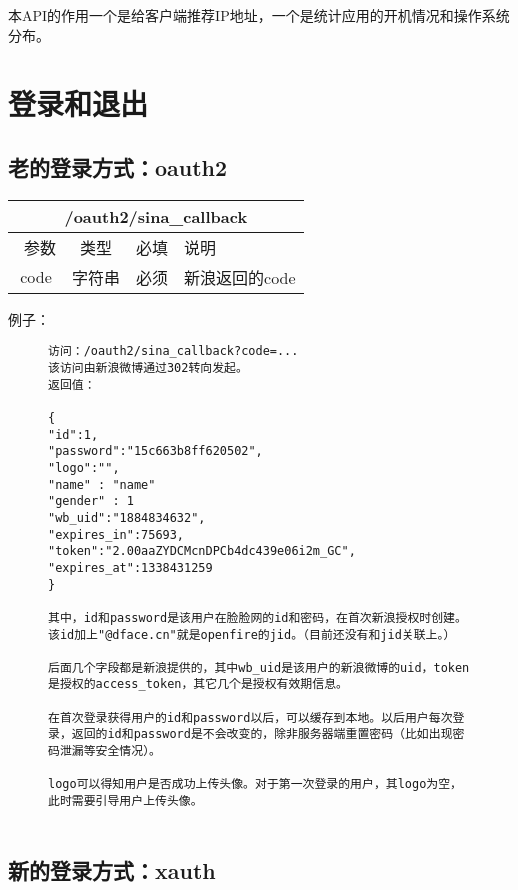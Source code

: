 \documentclass[cs4size]{ctexartutf8}
\begin{document}
本API的作用一个是给客户端推荐IP地址，一个是统计应用的开机情况和操作系统分布。




\section{登录和退出}
\subsection{老的登录方式：oauth2}


\begin{table}[H]
   \begin{center}
\begin{tabular}{|c|c|c|p{12cm}|}
\hline
\multicolumn{4}{|c|}{/oauth2/sina\_callback} \\
\hline\hline
 \  参数  & 类型 & 必填 &  说明  \\
\hline
 code  & 字符串 & 必须 &  新浪返回的code\\
\hline
\end{tabular}
   \end{center}
\end{table}


例子：

\begin{figure}[H]
\begin{verbatim}
访问：/oauth2/sina_callback?code=...
该访问由新浪微博通过302转向发起。
返回值：

{
"id":1,
"password":"15c663b8ff620502",
"logo":"",
"name" : "name"
"gender" : 1
"wb_uid":"1884834632",
"expires_in":75693,
"token":"2.00aaZYDCMcnDPCb4dc439e06i2m_GC",
"expires_at":1338431259
}

其中，id和password是该用户在脸脸网的id和密码，在首次新浪授权时创建。该id加上"@dface.cn"就是openfire的jid。（目前还没有和jid关联上。）

后面几个字段都是新浪提供的，其中wb_uid是该用户的新浪微博的uid，token是授权的access_token，其它几个是授权有效期信息。

在首次登录获得用户的id和password以后，可以缓存到本地。以后用户每次登录，返回的id和password是不会改变的，除非服务器端重置密码（比如出现密码泄漏等安全情况）。

logo可以得知用户是否成功上传头像。对于第一次登录的用户，其logo为空，此时需要引导用户上传头像。


\end{verbatim}
\end{figure}

\subsection{新的登录方式：xauth}
\label{hash_algorithm}
\end{document}
